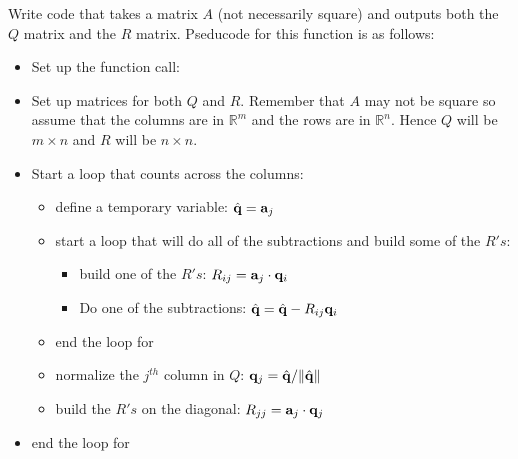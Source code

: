 \begin{problem}
    Write \ProgLang code that takes a matrix $A$ (not necessarily square) and outputs 
    both the $Q$ matrix and the $R$ matrix. Pseducode for this function is as follows:
    \begin{itemize}
        \item Set up the function call:\\ 
            \ifnum{}
            \else
            \fi
        \item Set up  matrices for both $Q$ and $R$.  Remember that $A$ may
            not be square so assume that the columns are in $\mathbb{R}^m$ and the rows
            are in $\mathbb{R}^n$.  Hence $Q$ will be $m \times n$ and $R$ will be $n
            \times n$.
        \item Start a loop that counts across the columns:\\ 
            \ifnum{}
            \else
            \fi
            \begin{itemize}
                \item define a temporary variable: $\hat{{\bf q}} = {\bf a}_j$
                \item start a loop that will do all of the subtractions and build some of
                    the $R's$:\\ 
                    \ifnum{}
                    \else
                    \fi
                    \begin{itemize}
                        \item build one of the $R's$: $R_{ij} = {\bf a}_j \cdot {\bf q}_i$
                        \item Do one of the subtractions: $\hat{{\bf q}} = \hat{{\bf q}} - R_{ij} {\bf q}_i$
                    \end{itemize}
                \item end the loop for 
                \item normalize the $j^{th}$ column in $Q$: ${\bf q}_j = \hat{{\bf q}} / \| \hat{{\bf q}} \|$
                \item build the $R's$ on the diagonal: $R_{jj} = {\bf a}_j \cdot {\bf q}_j$
            \end{itemize}
        \item end the loop for 
    \end{itemize}
\end{problem}

